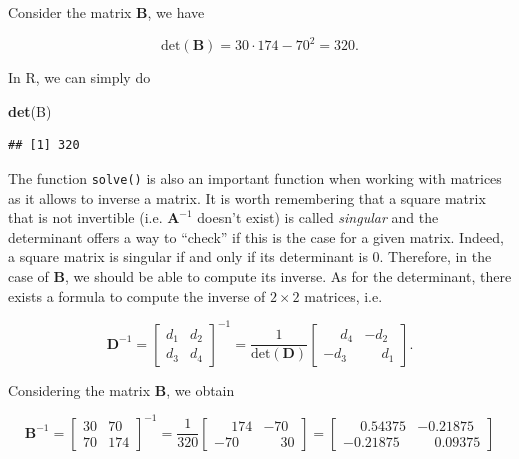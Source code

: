 \documentclass[12pt,]{krantz}
\newenvironment{Shaded}{\begin{snugshade}}{\end{snugshade}}
\newcommand{\KeywordTok}[1]{\textcolor[rgb]{0.27,0.27,0.27}{\textbf{#1}}}
\newcommand{\NormalTok}[1]{#1}
\begin{document}
Consider the matrix \(\mathbf{B}\), we have

\begin{equation*}
  \text{det} \left( \mathbf{B}\right) = 30 \cdot 174 - 70^2 = 320.
\end{equation*}

In R, we can simply do

\begin{Shaded}
\begin{Highlighting}[]
\KeywordTok{det}\NormalTok{(B)}
\end{Highlighting}
\end{Shaded}

\begin{verbatim}
## [1] 320
\end{verbatim}

The function \texttt{solve()} is also an important function when working
with matrices as it allows to inverse a matrix. It is worth remembering
that a square matrix that is not invertible (i.e. \(\mathbf{A}^{-1}\)
doesn't exist) is called \emph{singular} and the determinant offers a
way to ``check'' if this is the case for a given matrix. Indeed, a
square matrix is singular if and only if its determinant is 0.
Therefore, in the case of \(\mathbf{B}\), we should be able to compute
its inverse. As for the determinant, there exists a formula to compute
the inverse of \(2 \times 2\) matrices, i.e.

\begin{equation*}
 \mathbf{D}^{-1} = \left[
\begin{matrix}
d_1 & d_2\\
d_3 & d_4
\end{matrix}
\right]^{-1} = \frac{1}{\text{det}\left( \mathbf{D} \right)} \left[
\begin{matrix}
\phantom{-}d_4 & -d_2\\
-d_3 & \phantom{-}d_1
\end{matrix}
\right].
\end{equation*}

Considering the matrix \(\mathbf{B}\), we obtain

\begin{equation*}
 \mathbf{B}^{-1} = \left[
\begin{matrix}
30 & 70\\
70 & 174
\end{matrix}
\right]^{-1} = \frac{1}{320}\left[
\begin{matrix}
  \phantom{-}174 & -70\\
-70 & \phantom{-}30
\end{matrix}
\right] = \left[
\begin{matrix}
  \phantom{-}0.54375 & -0.21875\\
-0.21875 & \phantom{-}0.09375
\end{matrix}
\right] 
\end{equation*}
\end{document}
